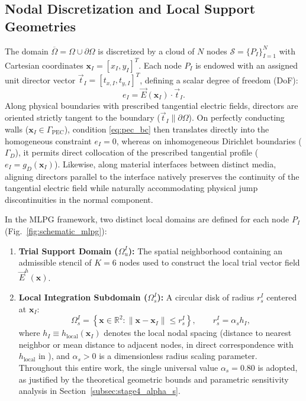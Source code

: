 \documentclass[VANCOUVER,Times1COL]{WileyNJD-v5}
\begin{document}
\subsection{Nodal Discretization and Local Support Geometries}
\label{subsec:nodal_discretization}

The domain $\overline{\Omega} = \Omega \cup \partial\Omega$ is discretized by a cloud of $N$ nodes $\mathcal{S} = \{P_I\}_{I=1}^N$ with Cartesian coordinates $\mathbf{x}_I = [x_I, y_I]^T$. Each node $P_I$ is endowed with an assigned unit director vector $\vec{t}_I = [t_{x,I}, t_{y,I}]^T$, defining a scalar degree of freedom (DoF):
\begin{equation}
    e_I = \vec{E}(\mathbf{x}_I) \cdot \vec{t}_I.
\end{equation}
Along physical boundaries with prescribed tangential electric fields, directors are oriented strictly tangent to the boundary ($\vec{t}_I \parallel \partial\Omega$). On perfectly conducting walls ($\mathbf{x}_I \in \Gamma_{\mathrm{PEC}}$), condition \eqref{eq:pec_bc} then translates directly into the homogeneous constraint $e_I = 0$, whereas on inhomogeneous Dirichlet boundaries ($\Gamma_D$), it permits direct collocation of the prescribed tangential profile ($e_I = g_D(\mathbf{x}_I)$). Likewise, along material interfaces between distinct media, aligning directors parallel to the interface natively preserves the continuity of the tangential electric field while naturally accommodating physical jump discontinuities in the normal component.

In the MLPG framework, two distinct local domains are defined for each node $P_I$ (Fig.~\ref{fig:schematic_mlpg}):
\begin{enumerate}
    \item \textbf{Trial Support Domain ($\Omega_u^I$):} The spatial neighborhood containing an admissible stencil of $K = 6$ nodes used to construct the local trial vector field $\vec{E}^h(\mathbf{x})$.
    \item \textbf{Local Integration Subdomain ($\Omega_s^I$):} A circular disk of radius $r_s^I$ centered at $\mathbf{x}_I$:
          \begin{equation}
              \Omega_s^I = \left\{ \mathbf{x} \in \mathbb{R}^2 : \|\mathbf{x} - \mathbf{x}_I\| \le r_s^I \right\}, \qquad r_s^I = \alpha_s h_I,
              \label{eq:subdomain_disk}
          \end{equation}
          where $h_I \equiv h_{\mathrm{local}}(\mathbf{x}_I)$ denotes the local nodal spacing (distance to nearest neighbor or mean distance to adjacent nodes, in direct correspondence with $h_{\mathrm{local}}$ in \cite{stable_vnmm2d_2026}), and $\alpha_s > 0$ is a dimensionless radius scaling parameter. Throughout this entire work, the single universal value $\alpha_s = 0.80$ is adopted, as justified by the theoretical geometric bounds and parametric sensitivity analysis in Section~\ref{subsec:stage4_alpha_s}.
\end{enumerate}
\end{document}
